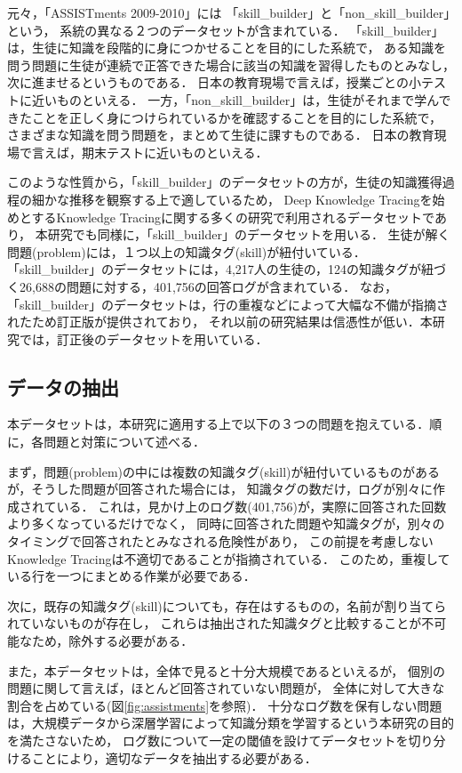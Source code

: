 元々，「ASSISTments 2009-2010」には
「skill\_builder」と「non\_skill\_builder」という，
系統の異なる２つのデータセットが含まれている．
「skill\_builder」は，生徒に知識を段階的に身につかせることを目的にした系統で，
ある知識を問う問題に生徒が連続で正答できた場合に該当の知識を習得したものとみなし，次に進ませるというものである．
日本の教育現場で言えば，授業ごとの小テストに近いものといえる．
一方，「non\_skill\_builder」は，生徒がそれまで学んできたことを正しく身につけられているかを確認することを目的にした系統で，
さまざまな知識を問う問題を，まとめて生徒に課すものである．
日本の教育現場で言えば，期末テストに近いものといえる．

このような性質から，「skill\_builder」のデータセットの方が，生徒の知識獲得過程の細かな推移を観察する上で適しているため，
Deep Knowledge Tracing\cite{piech2015deep}を始めとするKnowledge Tracingに関する多くの研究で利用されるデータセットであり，
本研究でも同様に，「skill\_builder」のデータセットを用いる．
生徒が解く問題(problem)には，１つ以上の知識タグ(skill)が紐付いている．
「skill\_builder」のデータセットには，4,217人の生徒の，124の知識タグが紐づく26,688の問題に対する，401,756の回答ログが含まれている．
なお，「skill\_builder」のデータセットは，行の重複などによって大幅な不備が指摘されたため訂正版が提供されており，
それ以前の研究結果は信憑性が低い．本研究では，訂正後のデータセットを用いている．


\subsection{データの抽出}
本データセットは，本研究に適用する上で以下の３つの問題を抱えている．順に，各問題と対策について述べる．

まず，問題(problem)の中には複数の知識タグ(skill)が紐付いているものがあるが，そうした問題が回答された場合には，
知識タグの数だけ，ログが別々に作成されている．
これは，見かけ上のログ数(401,756)が，実際に回答された回数より多くなっているだけでなく，
同時に回答された問題や知識タグが，別々のタイミングで回答されたとみなされる危険性があり，
この前提を考慮しないKnowledge Tracingは不適切であることが指摘されている\cite{xiong2016going}．
このため，重複している行を一つにまとめる作業が必要である．

次に，既存の知識タグ(skill)についても，存在はするものの，名前が割り当てられていないものが存在し，
これらは抽出された知識タグと比較することが不可能なため，除外する必要がある．


また，本データセットは，全体で見ると十分大規模であるといえるが，
個別の問題に関して言えば，ほとんど回答されていない問題が，
全体に対して大きな割合を占めている(図\ref{fig:assistments}を参照)．
十分なログ数を保有しない問題は，大規模データから深層学習によって知識分類を学習するという本研究の目的を満たさないため，
ログ数について一定の閾値を設けてデータセットを切り分けることにより，適切なデータを抽出する必要がある．


